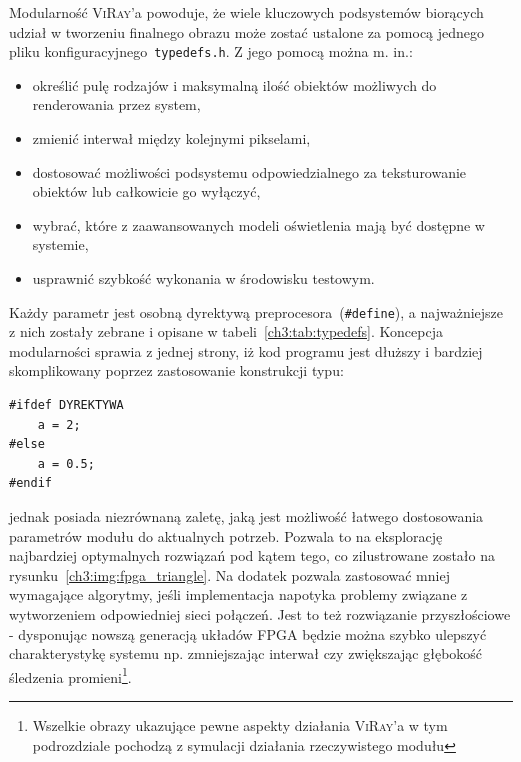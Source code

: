 Modularność \textsc{ViRay}'a powoduje, że wiele kluczowych podsystemów biorących udział w tworzeniu finalnego obrazu może zostać ustalone za pomocą jednego pliku konfiguracyjnego~\texttt{typedefs.h}. Z jego pomocą można m. in.:
\begin{itemize}
\item określić pulę rodzajów i maksymalną ilość obiektów możliwych do renderowania przez system,
\item zmienić interwał między kolejnymi pikselami,
\item dostosować możliwości podsystemu odpowiedzialnego za teksturowanie obiektów lub całkowicie go wyłączyć,
\item wybrać, które z zaawansowanych modeli oświetlenia mają być dostępne w systemie,
\item usprawnić szybkość wykonania w środowisku testowym.
\end{itemize}
Każdy parametr jest osobną dyrektywą preprocesora~(\texttt{\#define}), a najważniejsze z nich zostały zebrane i opisane w tabeli~\ref{ch3:tab:typedefs}. Koncepcja modularności sprawia z jednej strony, iż kod programu jest dłuższy i bardziej skomplikowany poprzez zastosowanie konstrukcji typu:
\begin{lstlisting}
#ifdef DYREKTYWA
	a = 2;
#else
	a = 0.5;
#endif
\end{lstlisting}
jednak posiada niezrównaną zaletę, jaką jest możliwość łatwego dostosowania parametrów modułu do aktualnych potrzeb. Pozwala to na eksplorację najbardziej optymalnych rozwiązań pod kątem tego, co zilustrowane zostało na rysunku~\ref{ch3:img:fpga_triangle}. Na dodatek pozwala zastosować mniej wymagające algorytmy, jeśli implementacja napotyka problemy związane z wytworzeniem odpowiedniej sieci połączeń. Jest to też rozwiązanie przyszłościowe - dysponując nowszą generacją układów FPGA będzie można szybko ulepszyć charakterystykę systemu np. zmniejszając interwał czy zwiększając głębokość śledzenia promieni\footnote{Wszelkie obrazy ukazujące pewne aspekty działania \textsc{ViRay}'a w tym podrozdziale pochodzą z symulacji działania rzeczywistego modułu}.



